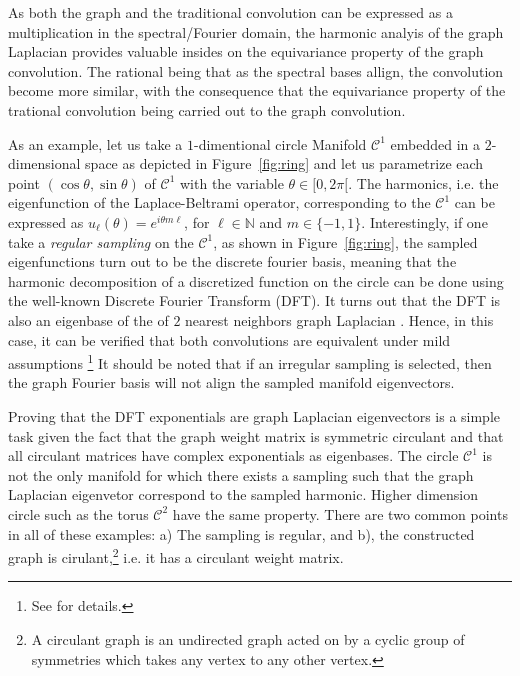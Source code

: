 \documentclass{article} %
\newcommand{\figref}[1]{Figure~\ref{fig:#1}}
\newcommand{\1}{\b{1}}              %
\newcommand{\0}{\b{0}}              %
\newcommand{\todo}[1]{{\color[rgb]{.6,.1,.6}{#1}}}
\begin{document}

As both the graph and the traditional convolution can be expressed as a multiplication in the spectral/Fourier domain, the harmonic analyis of the graph Laplacian provides valuable insides on the equivariance property of the graph convolution. 
The rational being that as the spectral bases allign, the convolution become more similar, with the consequence that the equivariance property of the trational convolution being carried out to the graph convolution. 



As an example, let us take a $1$-dimentional circle Manifold $\mathcal{C}^1$ embedded in a $2$-dimensional space as depicted in \figref{ring} and let us parametrize each point $(\cos\theta,\sin\theta)$ of $\mathcal{C}^1$ with the variable $\theta\in[0,2\pi[$.
The harmonics, i.e. the eigenfunction of the Laplace-Beltrami operator, corresponding to the $\mathcal{C}^1$ can be expressed as $u_\ell(\theta)=e^{i \theta m \ell}$, for $\ell \in \mathbb{N}$ and $m\in\{-1,1\}$. 
Interestingly, if one take a \emph{regular sampling} on the $\mathcal{C}^1$, as shown in \figref{ring}, the sampled eigenfunctions turn out to be the discrete fourier basis, meaning that the harmonic decomposition of a discretized function on the circle can be done using the well-known Discrete Fourier Transform (DFT). 
It turns out that the DFT is also an eigenbase of the of $2$ nearest neighbors graph Laplacian \cite{strang1999discrete}. Hence, in this case, it can be verified that both convolutions are equivalent under mild assumptions \footnote{See \cite[section 2.2 and Equation3]{perraudin2017stationary} for details.} 
It should be noted that if an irregular sampling is selected, then the graph Fourier basis will not align the sampled manifold eigenvectors. 


Proving that the DFT exponentials are graph Laplacian eigenvectors is a simple task given the fact that the graph weight matrix is symmetric circulant and that all circulant matrices have complex exponentials as eigenbases. 
The circle $\mathcal{C}^1$ is not the only manifold for which there exists a sampling such that the graph Laplacian eigenvetor correspond to the sampled harmonic.
Higher dimension circle such as the torus $\mathcal{C}^2$ have the same property. 
There are two common points in all of these examples: a) The sampling is regular, and b), the constructed graph is cirulant,\footnote{A circulant graph is an undirected graph acted on by a cyclic group of symmetries which takes any vertex to any other vertex.} i.e. it has a circulant weight matrix.
\end{document}
